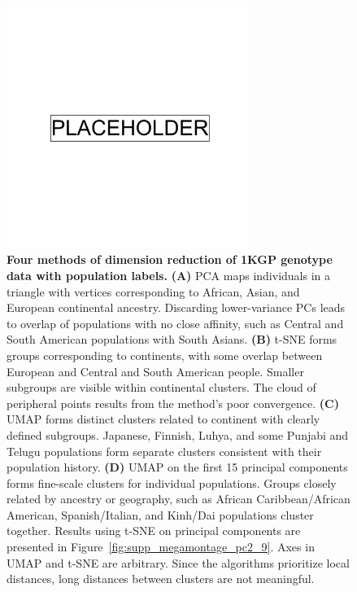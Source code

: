 \clearpage

\begin{figure}[ht]
    \centering
    \includegraphics[width=0.7\textwidth]{placeholder.png}
    \caption[Four methods of dimension reduction of 1KGP genotype data]{\textbf{Four methods of dimension reduction of 1KGP genotype data with population labels.} \textbf{(A)} PCA maps individuals in a triangle with vertices corresponding to African, Asian, and European continental ancestry. Discarding lower-variance PCs leads to overlap of populations with no close affinity, such as Central and South American populations with South Asians. \textbf{(B)} t-SNE forms groups corresponding to continents, with some overlap between European and Central and South American people. Smaller subgroups are visible within continental clusters. The cloud of peripheral points results from the method's poor convergence. \textbf{(C)} UMAP forms distinct clusters related to continent with clearly defined subgroups. Japanese, Finnish, Luhya, and some Punjabi and Telugu populations form separate clusters consistent with their population history\citep{10002015global}. \textbf{(D)} UMAP on the first 15 principal components forms fine-scale clusters for individual populations. Groups closely related by ancestry or geography, such as African Caribbean/African American, Spanish/Italian, and Kinh/Dai populations cluster together. Results using t-SNE on principal components are presented in Figure~\ref{fig:supp_megamontage_pc2_9}. Axes in UMAP and t-SNE are arbitrary. Since the algorithms prioritize local distances, long distances between clusters are not meaningful.}
    \label{fig:fig1}
\end{figure}

